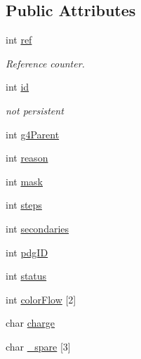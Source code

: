 \subsection*{Public Attributes}
\begin{DoxyCompactItemize}
\item 
int \hyperlink{class_d_d4hep_1_1_simulation_1_1_geant4_particle_a45f03922ef0363d2598befeec4027d59}{ref}
\begin{DoxyCompactList}\small\item\em Reference counter. \item\end{DoxyCompactList}\item 
int \hyperlink{class_d_d4hep_1_1_simulation_1_1_geant4_particle_acc6eea6683706e87e8b769c94caf3cd2}{id}
\begin{DoxyCompactList}\small\item\em not persistent \item\end{DoxyCompactList}\item 
int \hyperlink{class_d_d4hep_1_1_simulation_1_1_geant4_particle_a0a8fe0ae8782e18a88f1dd44556de52b}{g4Parent}
\item 
int \hyperlink{class_d_d4hep_1_1_simulation_1_1_geant4_particle_a290a8ba466d76df567c0a9809a80fbc1}{reason}
\item 
int \hyperlink{class_d_d4hep_1_1_simulation_1_1_geant4_particle_a907e9a43cf268196ff3b3e9e1be52b57}{mask}
\item 
int \hyperlink{class_d_d4hep_1_1_simulation_1_1_geant4_particle_acb743ee2fab907c9734fdb2523132833}{steps}
\item 
int \hyperlink{class_d_d4hep_1_1_simulation_1_1_geant4_particle_ac27f420d9419ca31a1506cc6ac419043}{secondaries}
\item 
int \hyperlink{class_d_d4hep_1_1_simulation_1_1_geant4_particle_a0af9d9907bce8d40f3bf0207fb6424c3}{pdgID}
\item 
int \hyperlink{class_d_d4hep_1_1_simulation_1_1_geant4_particle_af9637a505c345dfe4a16309aa80ba89d}{status}
\item 
int \hyperlink{class_d_d4hep_1_1_simulation_1_1_geant4_particle_a739e02b76f159e26d92023cd1746c8cf}{colorFlow} \mbox{[}2\mbox{]}
\item 
char \hyperlink{class_d_d4hep_1_1_simulation_1_1_geant4_particle_a4c8f5bf9cfae6c1089554a86e8a752bc}{charge}
\item 
char \hyperlink{class_d_d4hep_1_1_simulation_1_1_geant4_particle_abcd4d3e8d4b0c636deff9612e7d726d0}{\_\-spare} \mbox{[}3\mbox{]}

\end{DoxyCompactItemize}
